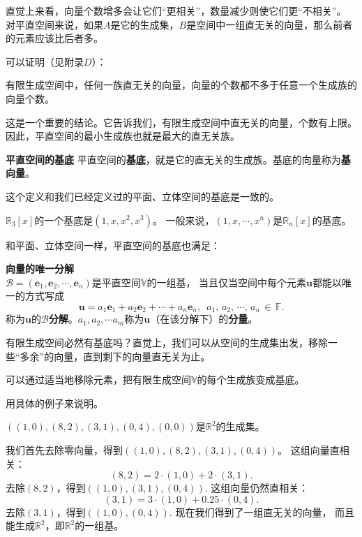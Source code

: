 \documentclass[12pt,UTF8,fontset=none]{ctexbook}
\begin{document}
直觉上来看，向量个数增多会让它们“更相关”，数量减少则使它们更“不相关”。
对平直空间来说，如果$A$是它的生成集，$B$是空间中一组直无关的向量，那么前者的元素应该比后者多。

可以证明（见附录$D$）：
\begin{tm}\label{tm:4-3-10}
    有限生成空间中，任何一族直无关的向量，向量的个数都不多于任意一个生成族的向量个数。
\end{tm}
这是一个重要的结论。它告诉我们，有限生成空间中直无关的向量，个数有上限。
因此，平直空间的最小生成族也就是最大的直无关族。

\begin{df}{\textbf{平直空间的基底}}
    平直空间的\textbf{基底}，就是它的直无关的生成族。基底的向量称为\textbf{基向量}。
\end{df}

这个定义和我们已经定义过的平面、立体空间的基底是一致的。

$\mathbb{R}_3[x]$的一个基底是$(1, x, x^2, x^3)$。
一般来说，$(1, x, \cdots, x^n)$是$\mathbb{R}_n[x]$的基底。

和平面、立体空间一样，平直空间的基底也满足：
\begin{tm}{\textbf{向量的唯一分解}}\label{tm:4-3-20}\\
    $ \mathcal{B} = (\mathbf{e}_1, \mathbf{e}_2, \cdots , \mathbf{e}_n )$是平直空间$\mathbb{V}$的一组基，
    当且仅当空间中每个元素$\mathbf{u}$都能以唯一的方式写成
    $$ \mathbf{u} = a_1\mathbf{e}_1 +a_2 \mathbf{e}_2 + \cdots + a_n\mathbf{e}_n, \,\,\, a_1,\,a_2,\,\cdots,\, a_n \,\in\,\mathbb{F}.$$
    称为$\mathbf{u}$的$\mathcal{B}$\textbf{分解}。$a_1, a_2, \cdots a_m$称为$\mathbf{u}$（在该分解下）的\textbf{分量}。
\end{tm}

有限生成空间必然有基底吗？直觉上，我们可以从空间的生成集出发，移除一些“多余”的向量，直到剩下的向量直无关为止。

\begin{tm}\label{tm:4-3-40}
    可以通过适当地移除元素，把有限生成空间$\mathbb{V}$的每个生成族变成基底。
\end{tm}

用具体的例子来说明。

$\left((1,0),(8,2),(3,1),(0,4),(0,0)\right)$是$\mathbb{R}^2$的生成集。

我们首先去除零向量，得到$\left((1,0),(8,2),(3,1),(0,4)\right)$。 
这组向量直相关：
$$ (8,2) = 2\cdot(1,0) + 2\cdot(3,1).$$
去除$(8,2)$，得到$\left((1,0),(3,1),(0,4)\right).$ 这组向量仍然直相关：
$$ (3,1) = 3\cdot(1,0) + 0.25\cdot(0,4).$$
去除$(3,1)$，得到$\left((1,0),(0,4)\right).$ 现在我们得到了一组直无关的向量，
而且能生成$\mathbb{R}^2$，即$\mathbb{R}^2$的一组基。
\end{document}
